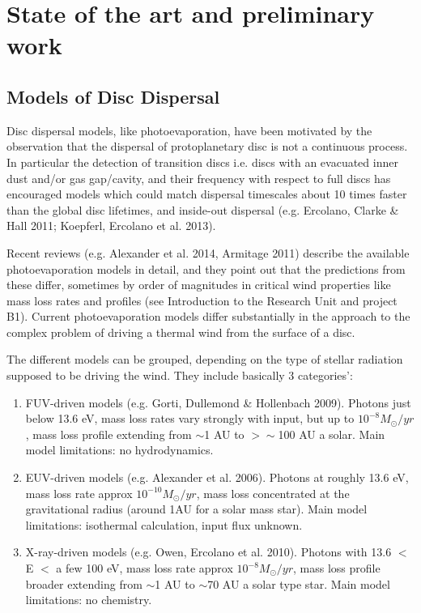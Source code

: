 \documentclass[10pt,fleqn,twoside]{article}
\newcommand{\Tcol}{\color{blue}}
\begin{document}
\section{\Tcol State of the art and preliminary work}
\renewcommand{\leftmark}{\sc State of the Art and preliminary work}

\subsection{Models of Disc Dispersal}

Disc dispersal models, like photoevaporation, have been motivated by
the observation that the dispersal of protoplanetary disc is
not a continuous process. In particular the detection of transition
discs i.e. discs with an evacuated inner dust
and/or gas gap/cavity, and their frequency with respect to full discs
has encouraged models which could match dispersal
timescales about 10 times faster than the global disc
lifetimes, and inside-out dispersal  (e.g. Ercolano, Clarke \& Hall 2011;
Koepferl, Ercolano et al. 2013). 

Recent reviews (e.g. Alexander et al. 2014, Armitage 2011) describe
the available photoevaporation models in detail, and they point out that the
predictions from these differ, sometimes by order of magnitudes in
critical wind properties like mass loss rates and profiles (see
Introduction to the Research Unit and project B1). Current
photoevaporation models differ
substantially in the approach to the complex problem of driving a
thermal wind from the surface of a disc. 

The different models can be grouped, depending on
the type of stellar radiation supposed to be driving the wind. They
include basically 3 categories':

\begin{enumerate}
\item FUV-driven models (e.g. Gorti, Dullemond \& Hollenbach
  2009). Photons just below 13.6 eV, mass loss rates vary strongly
  with input, but up to $10^{-8}M_{\odot}/yr$, mass
loss profile extending from $\sim$1 AU to  $>\sim$100 AU a
solar. Main model limitations: no hydrodynamics. 
\item EUV-driven models (e.g. Alexander et al. 2006). Photons at
  roughly 13.6 eV, mass loss rate approx $10^{-10}M_{\odot}/yr$, mass
loss concentrated at the gravitational radius (around 1AU for a solar
mass star). Main model limitations: isothermal calculation, input flux
unknown. 
\item X-ray-driven models (e.g. Owen, Ercolano et al. 2010). Photons
  with 13.6 $<$ E $<$ a few 100 eV, mass loss rate approx $10^{-8}M_{\odot}/yr$, mass
loss profile broader extending from $\sim$1 AU to  $\sim$70 AU a solar
type star. Main model limitations: no chemistry. 
\end{enumerate}
\end{document}

